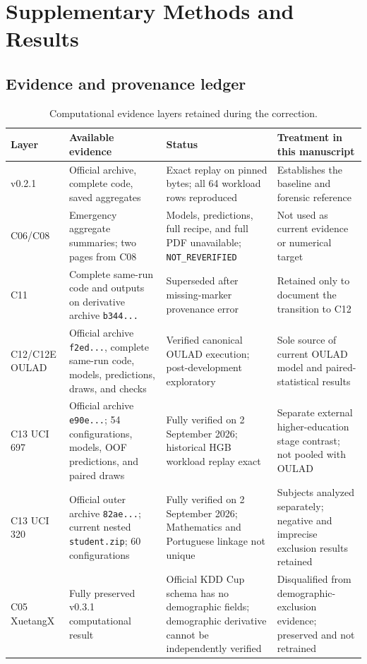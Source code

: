 \section{Supplementary Methods and Results}

\subsection{Evidence and provenance ledger}

\begin{table}[htbp]
\centering
\caption{Computational evidence layers retained during the correction.}
\label{tab:s_provenance}
\small
\begin{tabularx}{\textwidth}{>{\raggedright\arraybackslash}p{} >{\raggedright\arraybackslash}p{} >{\raggedright\arraybackslash}p{} X}
\toprule
Layer & Available evidence & Status & Treatment in this manuscript \\
\midrule
v0.2.1 & Official archive, complete code, saved aggregates & Exact replay on pinned bytes; all 64 workload rows reproduced & Establishes the baseline and forensic reference \\
C06/C08 & Emergency aggregate summaries; two pages from C08 & Models, predictions, full recipe, and full PDF unavailable; \texttt{NOT\_REVERIFIED} & Not used as current evidence or numerical target \\
C11 & Complete same-run code and outputs on derivative archive \texttt{b344...} & Superseded after missing-marker provenance error & Retained only to document the transition to C12 \\
C12/C12E OULAD & Official archive \texttt{f2ed...}, complete same-run code, models, predictions, draws, and checks & Verified canonical OULAD execution; post-development exploratory & Sole source of current OULAD model and paired-statistical results \\
C13 UCI 697 & Official archive \texttt{e90e...}; 54 configurations, models, OOF predictions, and paired draws & Fully verified on 2 September 2026; historical HGB workload replay exact & Separate external higher-education stage contrast; not pooled with OULAD \\
C13 UCI 320 & Official outer archive \texttt{82ae...}; current nested \texttt{student.zip}; 60 configurations & Fully verified on 2 September 2026; Mathematics and Portuguese linkage not unique & Subjects analyzed separately; negative and imprecise exclusion results retained \\
C05 XuetangX & Fully preserved v0.3.1 computational result & Official KDD Cup schema has no demographic fields; demographic derivative cannot be independently verified & Disqualified from demographic-exclusion evidence; preserved and not retrained \\
\bottomrule
\end{tabularx}
\end{table}
\FloatBarrier

